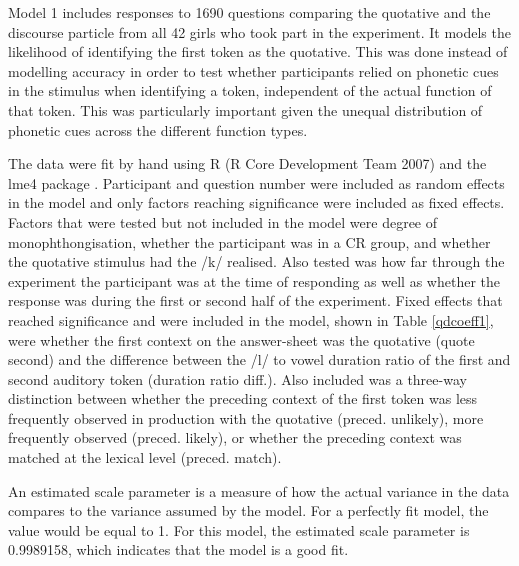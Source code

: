 Model 1 includes responses to 1690 questions comparing the quotative and the discourse particle from all 42 girls who took part in the experiment.  It models the likelihood of identifying the first token as the quotative.  This was done instead of modelling accuracy in order to test whether participants relied on phonetic cues in the stimulus when identifying a token, independent of the actual function of that token.  This was particularly important given the unequal distribution of phonetic cues across the different function types.

The data were fit by hand using R (R Core Development Team 2007) and the lme4 package \cite{lme4}.   Participant and question num\-ber were in\-cluded as ran\-dom effects in the mo\-del and only factors reaching significance were included as fixed effects.  Fac\-tors that were test\-ed but not in\-cluded in the mo\-del were de\-gree of mo\-noph\-thong\-isa\-tion, whether the participant was in a CR group, and whether the quotative stimulus had the /k/ realised.  Also tested was how far through the experiment the participant was at the time of responding as well as whether the response was during the first or second half of the experiment.  Fixed effects that reached significance and were included in the model, shown in Table \ref{qdcoeff1}, were whether the first context on the answer-sheet was the quotative (quote second) and the difference between the /l/ to vowel duration ratio of the first and second auditory token (duration ratio diff.).  Also included was a three-way distinction between whether the preceding context of the first token was less frequently observed in production with the quotative (preced. unlikely), more frequently observed (preced. likely), or whether the preceding context was matched at the lexical level (preced. match).  

An estimated scale parameter is a measure of how the actual variance in the data compares to the variance assumed by the model. For a perfectly fit model, the value would be equal to 1.  For this model, the estimated scale parameter is 0.9989158, which indicates that the model is a good fit. 

